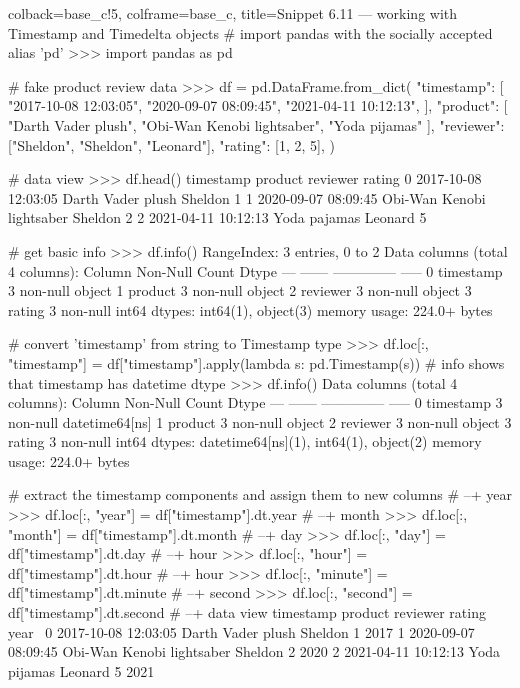 \documentclass[a4paper,11pt]{book}
\begin{document}
\begin{pythoncode}[linenos=True]{colback=base_c!5, colframe=base_c, title=\sffamily Snippet 6.11 --- working with Timestamp and Timedelta objects}
# import pandas with the socially accepted alias 'pd'
>>> import pandas as pd

# fake product review data
>>> df = pd.DataFrame.from\_dict(
        {
            "timestamp": [
                "2017-10-08 12:03:05",
                "2020-09-07 08:09:45",
                "2021-04-11 10:12:13",
            ],
            "product": [
		"Darth Vader plush",
		"Obi-Wan Kenobi lightsaber",
		"Yoda pijamas"
       ],
            "reviewer": ["Sheldon", "Sheldon", "Leonard"],
            "rating": [1, 2, 5],
        }
    )

# data view
>>> df.head()
             timestamp                    product reviewer  rating
0  2017-10-08 12:03:05          Darth Vader plush  Sheldon       1
1  2020-09-07 08:09:45  Obi-Wan Kenobi lightsaber  Sheldon       2
2  2021-04-11 10:12:13               Yoda pajamas  Leonard       5

# get basic info
>>> df.info()
RangeIndex: 3 entries, 0 to 2
Data columns (total 4 columns):
     Column     Non-Null Count  Dtype 
---  ------     --------------  ----- 
 0   timestamp  3 non-null      object
 1   product    3 non-null      object
 2   reviewer   3 non-null      object
 3   rating     3 non-null      int64 
dtypes: int64(1), object(3)
memory usage: 224.0+ bytes

# convert 'timestamp' from string to Timestamp type
>>> df.loc[:, "timestamp"] = df["timestamp"].apply(lambda s: pd.Timestamp(s))
# info shows that timestamp has datetime dtype  
>>> df.info()
Data columns (total 4 columns):
     Column     Non-Null Count  Dtype         
---  ------     --------------  -----         
 0   timestamp  3 non-null      datetime64[ns]
 1   product    3 non-null      object        
 2   reviewer   3 non-null      object        
 3   rating     3 non-null      int64         
dtypes: datetime64[ns](1), int64(1), object(2)
memory usage: 224.0+ bytes

# extract the timestamp components and assign them to new columns
# --+ year
>>> df.loc[:, "year"] = df["timestamp"].dt.year
# --+ month
>>> df.loc[:, "month"] = df["timestamp"].dt.month
# --+ day
>>> df.loc[:, "day"] = df["timestamp"].dt.day
# --+ hour
>>> df.loc[:, "hour"] = df["timestamp"].dt.hour
# --+ hour
>>> df.loc[:, "minute"] = df["timestamp"].dt.minute
# --+ second
>>> df.loc[:, "second"] = df["timestamp"].dt.second
# --+ data view
            timestamp                    product reviewer  rating  year  \
0 2017-10-08 12:03:05          Darth Vader plush  Sheldon       1  2017   
1 2020-09-07 08:09:45  Obi-Wan Kenobi lightsaber  Sheldon       2  2020   
2 2021-04-11 10:12:13               Yoda pijamas  Leonard       5  2021   


\end{pythoncode}
\end{document}
